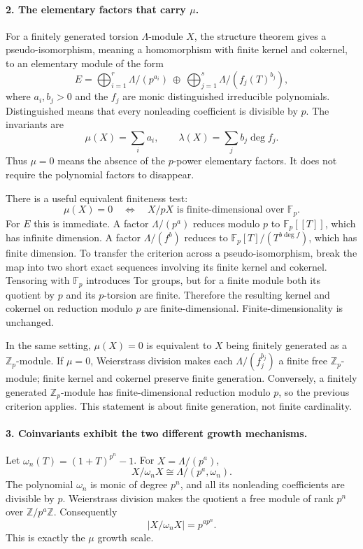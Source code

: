 \documentclass[11pt]{article}
\begin{document}
\paragraph{2. The elementary factors that carry $\mu$.}
For a finitely generated torsion $\Lambda$-module $X$, the structure theorem gives a pseudo-isomorphism, meaning a homomorphism with finite kernel and cokernel, to an elementary module of the form
\[
 E=\bigoplus_{i=1}^r\Lambda/(p^{a_i})
 \ \oplus\ \bigoplus_{j=1}^s\Lambda/(f_j(T)^{b_j}),
\]
where $a_i,b_j>0$ and the $f_j$ are monic distinguished irreducible polynomials. Distinguished means that every nonleading coefficient is divisible by $p$. The invariants are
\[
 \mu(X)=\sum_i a_i,\qquad
 \lambda(X)=\sum_jb_j\deg f_j.
\]
Thus $\mu=0$ means the absence of the $p$-power elementary factors. It does not require the polynomial factors to disappear.

There is a useful equivalent finiteness test:
\[
 \mu(X)=0\quad\Longleftrightarrow\quad X/pX
 \text{ is finite-dimensional over }\mathbb F_p.
\]
For $E$ this is immediate. A factor $\Lambda/(p^a)$ reduces modulo $p$ to $\mathbb F_p[[T]]$, which has infinite dimension. A factor $\Lambda/(f^b)$ reduces to $\mathbb F_p[T]/(T^{b\deg f})$, which has finite dimension. To transfer the criterion across a pseudo-isomorphism, break the map into two short exact sequences involving its finite kernel and cokernel. Tensoring with $\mathbb F_p$ introduces Tor groups, but for a finite module both its quotient by $p$ and its $p$-torsion are finite. Therefore the resulting kernel and cokernel on reduction modulo $p$ are finite-dimensional. Finite-dimensionality is unchanged.

In the same setting, $\mu(X)=0$ is equivalent to $X$ being finitely generated as a $\mathbb Z_p$-module. If $\mu=0$, Weierstrass division makes each $\Lambda/(f_j^{b_j})$ a finite free $\mathbb Z_p$-module; finite kernel and cokernel preserve finite generation. Conversely, a finitely generated $\mathbb Z_p$-module has finite-dimensional reduction modulo $p$, so the previous criterion applies. This statement is about finite generation, not finite cardinality.

\paragraph{3. Coinvariants exhibit the two different growth mechanisms.}
Let $\omega_n(T)=(1+T)^{p^n}-1$. For $X=\Lambda/(p^a)$,
\[
 X/\omega_nX\cong\Lambda/(p^a,\omega_n).
\]
The polynomial $\omega_n$ is monic of degree $p^n$, and all its nonleading coefficients are divisible by $p$. Weierstrass division makes the quotient a free module of rank $p^n$ over $\mathbb Z/p^a\mathbb Z$. Consequently
\[
 |X/\omega_nX|=p^{a p^n}.
\]
This is exactly the $\mu$ growth scale.
\end{document}
